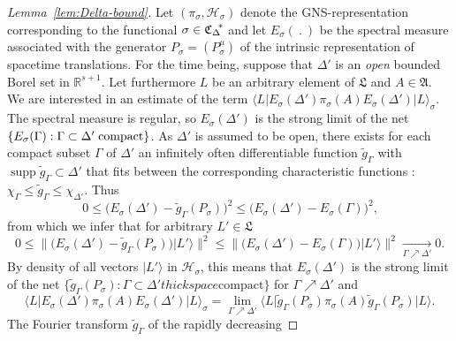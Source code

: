 \documentclass[a4paper,a4paper]{article}
\numberwithin{equation}{section}
\newcommand{\Afrak}{\mathfrak{A}}
\newcommand{\Lfrak}{\mathfrak{L}}
\newcommand{\Hscr}{\mathscr{H}}
\newcommand{\Rsone}{\mathbb{R}^{s + 1}}
\newcommand{\EsDprime}{E_\sigma ( \Delta' )}
\newcommand{\EsGamma}{E_\sigma ( \Gamma )}
\newcommand{\CDstar}{{\mathfrak{C}_\Delta}^{\negthickspace *}}
\theoremstyle{definition}
\theoremstyle{plain}
\theoremstyle{remark}
\DeclareMathOperator{\supp}{supp}
\newcommand{\set}[1]{\{ #1 \}}
\newcommand{\bset}[1]{\bigl\{ #1 \bigr\}}
\newcommand{\bnorm}[1]{\bigl\lVert #1 \bigr\rVert}
\newcommand{\ket}[1]{\vert #1 \rangle}
\newcommand{\scpx}[3]{\langle #1 \vert #2 \vert #3 \rangle}
\begin{document}
  \begin{proof}[Lemma~\ref{lem:Delta-bound}]
    Let $( \pi_\sigma , \Hscr_\sigma )$ denote the GNS-representation
    corresponding to the functional $\sigma \in \CDstar$ and let
    $E_\sigma (~.~)$ be the spectral measure associated with the
    generator $P_\sigma = ( P_\sigma^\mu )$ of the intrinsic
    representation of spacetime translations. For the time being,
    suppose that $\Delta'$ is an \emph{open} bounded Borel set in
    $\Rsone$. Let furthermore $L$ be an arbitrary element of $\Lfrak$
    and $A \in \Afrak$. We are interested in an estimate of the term
    $\scpx{L}{\EsDprime \pi_\sigma ( A ) \EsDprime}{L}_\sigma$. The
    spectral measure is regular, so $\EsDprime$ is the strong limit of
    the net $\set{\EsGamma : \Gamma \subset \Delta' \thickspace
    \text{compact}}$. As $\Delta'$ is assumed to be open, there
    exists for each compact subset $\Gamma$ of $\Delta'$ an infinitely
    often differentiable function $\tilde{g}_\Gamma$ with $\supp
    \tilde{g}_\Gamma \subset \Delta'$ that fits between the
    corresponding characteristic functions
    \cite[Satz~7.7]{jantscher:1971}: $\chi_\Gamma \leqslant
    \tilde{g}_\Gamma \leqslant \chi_{\Delta'}$. Thus
    \begin{equation*}
      0 \leqslant \bigl( \EsDprime - \tilde{g}_\Gamma ( P_\sigma )
      \bigr)^2 \leqslant \bigl( \EsDprime - \EsGamma \bigr)^2 \text{,}
    \end{equation*}
    from which we infer that for arbitrary $L' \in \Lfrak$
    \begin{equation}
      \label{eq:regular-Esigma-approx}
      0 \leqslant \bnorm{\bigl( \EsDprime - \tilde{g}_\Gamma (
      P_\sigma ) \bigr) \ket{L'}}^2 \leqslant \bnorm{\bigl( \EsDprime
      - \EsGamma \bigr) \ket{L'}}^2 \xrightarrow[\Gamma \nearrow
      \Delta']{} 0 \text{.}
    \end{equation}
    By density of all vectors $\ket{L'}$ in $\Hscr_\sigma$, this means
    that $\EsDprime$ is the strong limit of the net
    $\bset{\tilde{g}_\Gamma ( P_\sigma ) : \Gamma \subset \Delta'
     thickspace \text{compact}}$ for $\Gamma \nearrow \Delta'$ and
    \begin{equation}
      \label{eq:regular-approximation}
      \scpx{L}{\EsDprime \pi_\sigma ( A ) \EsDprime}{L}_\sigma =
      \lim_{\Gamma \nearrow \Delta'} \scpx{L}{\tilde{g}_\Gamma (
      P_\sigma ) \pi_\sigma ( A ) \tilde{g}_\Gamma ( P_\sigma )}{L}
      \text{.}
    \end{equation}
    The Fourier transform $\tilde{g}_\Gamma$ of the rapidly decreasing

\end{proof}
\end{document}
